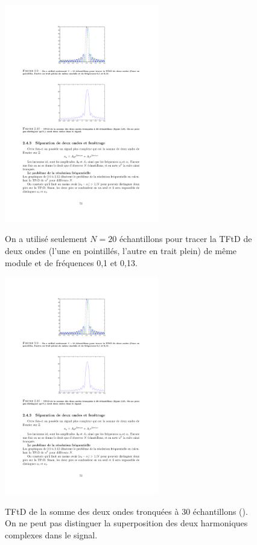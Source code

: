 \begin{figure}
  \centering
  \includegraphics[width=0.6\textwidth]{Figures/Figure2-9}\\
  \caption{On a utilis\'{e} seulement $N=20$ \'{e}chantillons pour tracer la TFtD de deux ondes (l'une en pointill\'{e}s, l'autre en trait plein) de m\^{e}me module et de fr\'{e}quences 0,1 et 0,13.}\label{fig:figure2-9}
\end{figure}

\begin{figure}
  \centering
  \includegraphics[width=0.6\textwidth]{Figures/Figure2-10}\\
  \caption{TFtD de la somme des deux ondes tronqu\'{e}es \`{a} 30 \'{e}chantillons (). On ne peut pas distinguer la superposition des deux harmoniques complexes dans le signal.}\label{fig:figure2-10}
\end{figure}

